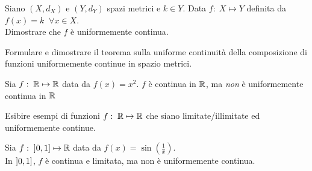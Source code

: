 \begin{exercise}
	Siano $(X,d_X)$ e $(Y,d_Y)$ spazi metrici e $k \in Y$. Data $f:\; X \mapsto Y$ definita da $f(x) = k\;\; \forall x \in X$.\\
	Dimostrare che $f$ è uniformemente continua.
\end{exercise}
\begin{exercise}
	Formulare e dimostrare il teorema sulla uniforme continuità della composizione di funzioni uniformemente continue in spazio metrici.
\end{exercise}
\begin{example}
	Sia $f:\; \mathbb{R} \mapsto \mathbb{R}$ data da $f(x) = x^2$. $f$ è continua in $\mathbb{R}$, ma \textit{non} è uniformemente continua in $\mathbb{R}$
\end{example}
\begin{exercise}
	Esibire esempi di funzioni $f:\; \mathbb{R} \mapsto \mathbb{R}$ che siano limitate/illimitate ed uniformemente continue.
\end{exercise}
\begin{example}
	Sia $f:\; \left]0,1\right] \mapsto \mathbb{R}$ data da $f(x) = \sin(\frac{1}{x})$.\\
	In $\left]0,1\right]$, $f$ è continua e limitata, ma non è uniformemente continua.
\end{example}

